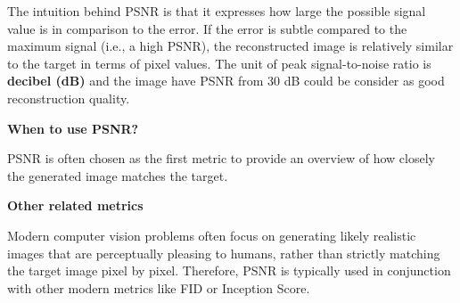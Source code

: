 \begin{center}
\end{center}

\vspace{-10pt}

The intuition behind PSNR is that it expresses how large the possible signal value is in comparison to the error. 
If the error is subtle compared to the maximum signal (i.e., a high PSNR), the reconstructed image is relatively similar to the target in terms of pixel values.
The unit of peak signal-to-noise ratio is \textbf{decibel (dB)} and the image have PSNR from 30 dB could be consider as good reconstruction quality.



\textbf{When to use PSNR?}

PSNR is often chosen as the first metric to provide an overview of how closely the generated image matches the target.

\textbf{Other related metrics}

Modern computer vision problems often focus on generating likely realistic images that are perceptually pleasing to humans, rather than strictly matching the target image pixel by pixel.
Therefore, PSNR is typically used in conjunction with other modern metrics like FID or Inception Score.


